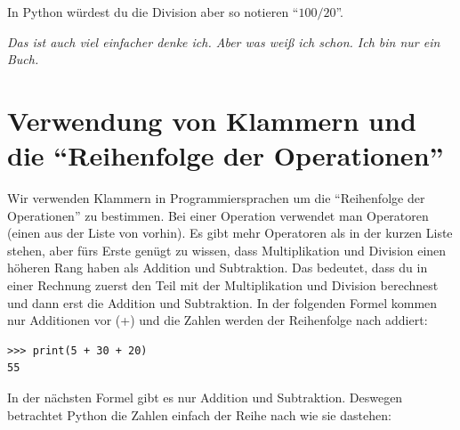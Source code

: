 In Python würdest du die Division aber so notieren ``$100 / 20$''.

\emph{Das ist auch viel einfacher denke ich. Aber was weiß ich schon. Ich bin nur ein Buch.}

\section{Verwendung von Klammern und die ``Reihenfolge der Operationen''}

Wir verwenden Klammern in Programmiersprachen um die ``Reihenfolge der Operationen'' zu bestimmen. Bei einer Operation verwendet man Operatoren (einen aus der Liste von vorhin). Es gibt mehr Operatoren als in der kurzen Liste stehen, aber fürs Erste genügt zu wissen, dass Multiplikation und Division einen höheren Rang haben als Addition und Subtraktion. Das bedeutet, dass du in einer Rechnung zuerst den Teil mit der Multiplikation und Division berechnest und dann erst die Addition und Subtraktion. In der folgenden Formel kommen nur Additionen vor (+) und die Zahlen werden der Reihenfolge nach addiert:

\begin{Verbatim}[frame=single]
>>> print(5 + 30 + 20)
55
\end{Verbatim}

\noindent
In der nächsten Formel gibt es nur Addition und Subtraktion. Deswegen betrachtet Python die Zahlen einfach der Reihe nach wie sie dastehen:

